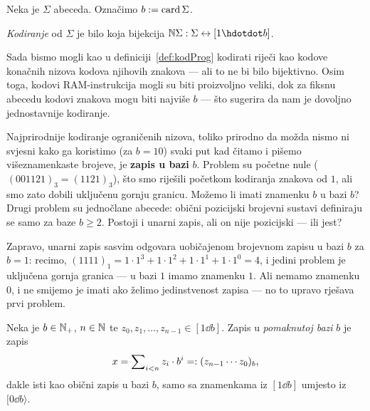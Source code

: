 \begin{definicija}[{name=[kodiranje abecede]}]
Neka je $\Sigma$ abeceda. Označimo $b:=\operatorname{card}\Sigma$. %

\emph{Kodiranje} od $\Sigma$ je bilo koja bijekcija $\N\Sigma:\Sigma\leftrightarrow[1\dd b]$.
\end{definicija}


Sada bismo mogli kao u definiciji~\ref{def:kodProg} kodirati riječi kao kodove konačnih nizova kodova njihovih znakova --- ali to ne bi bilo bijektivno. Osim toga, kodovi RAM-instrukcija mogli su biti proizvoljno veliki, dok za fiksnu abecedu kodovi znakova mogu biti najviše $b$ --- što sugerira da nam je dovoljno jednostavnije kodiranje.

Najprirodnije kodiranje ograničenih nizova, toliko prirodno da možda nismo ni svjesni kako ga koristimo (za $b=10$) svaki put kad čitamo i pišemo višeznamenkaste brojeve, je \textbf{zapis u bazi} $b$. Problem su početne nule ($\mspace{1mu}(001121)_3=(1121)_3$), što smo riješili početkom kodiranja znakova od $1$, ali smo zato dobili uključenu gornju granicu. Možemo li imati znamenku $b$ u bazi $b$? Drugi problem su jednočlane abecede: obični pozicijski brojevni sustavi definiraju se samo za baze $b\ge2$. Postoji i unarni zapis, ali on nije pozicijski --- ili jest?

Zapravo, unarni zapis sasvim odgovara uobičajenom brojevnom zapisu u bazi $b$ za $b=1$: recimo, $(1111)_1=1\cdot1^3+1\cdot1^2+1\cdot1^1+1\cdot1^0=4$, i jedini problem je uključena gornja granica --- u bazi $1$ imamo znamenku $1$. Ali nemamo znamenku $0$, i ne smijemo je imati ako želimo jedinstvenost zapisa --- no to upravo rješava prvi problem.

\begin{definicija}[{name=[zapis broja u pomaknutoj bazi]}]
Neka je $b\in{\mathbb N}_+$, $n\in{\mathbb N}$ te $z_0,z_1,\dotsc,z_{n-1}\in[1\dd b]$. Zapis u \emph{pomaknutoj bazi} $b$ je zapis
\begin{equation}\label{eq:pomakbaza}
    x=\sum\nolimits_{i<n}z_i\cdot b^i=:(z_{n-1}\dotsm z_0)_b\text,
\end{equation}
dakle isti kao obični zapis u bazi $b$, samo sa znamenkama iz $[1\dd b]$ umjesto iz $[0\dd b\rangle$.
\end{definicija}

